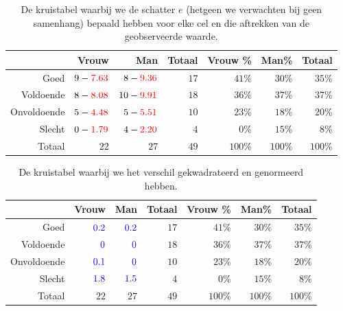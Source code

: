 \begin{table} \centering
  \begin{tabular}{@{}rrrrrrr@{}} \toprule
    & Vrouw & Man & Totaal & Vrouw \% & Man\%   & Totaal  \\ \midrule
    Goed        & $9 -\textcolor{red}{7.63}$     & $8 - \textcolor{red}{9.36}$   & $17$     & $41$\%  & $30$\% & $35$\% \\
    Voldoende   & $8 - \textcolor{red}{8.08}$   & $10 - \textcolor{red}{9.91}$  & $18$     & $36$\%  & $37$\%    & $37$\% \\
    Onvoldoende & $5 - \textcolor{red}{4.48}$    & $5 - \textcolor{red}{5.51}$  & $10$     & $23$\%  & $18$\% & $20$\% \\
    Slecht      & $0 - \textcolor{red}{1.79}$    & $4 - \textcolor{red}{2.20}$  & $4$      & $0$\%      & $15$\% & $8$\%  \\
    Totaal      & $22$    & $27$  & $49$     & $100$\%    & $100$\%   & $100$\%   \\
    \bottomrule
  \end{tabular}
  \caption{De kruistabel waarbij we de schatter $e$  (hetgeen we verwachten bij geen samenhang) bepaald hebben voor elke cel en die aftrekken van de geobserveerde waarde.}
  \label{tab:kruistabel2}
\end{table}

\begin{table} \centering
  \begin{tabular}{@{}rrrrrrr@{}} \toprule
    & Vrouw                   & Man                     & Totaal & Vrouw \% & Man\%   & Totaal  \\ \midrule
    Goed        & $\textcolor{blue}{0.2}$ & $\textcolor{blue}{0.2}$ & $17$   & $41$\%   & $30$\%  & $35$\% \\
    Voldoende   & $\textcolor{blue}{0}$   & $\textcolor{blue}{0}$   & $18$   & $36$\%   & $37$\%  & $37$\% \\
    Onvoldoende & $\textcolor{blue}{0.1}$ & $\textcolor{blue}{0}$   & $10$   & $23$\%   & $18$\%  & $20$\% \\
    Slecht      & $\textcolor{blue}{1.8}$ & $\textcolor{blue}{1.5}$ & $4$    & $0$\%    & $15$\%  & $8$\%  \\
    Totaal      & $22$                    & $27$                    & $49$   & $100$\%  & $100$\% & $100$\%   \\
    \bottomrule
  \end{tabular}
  \caption{De kruistabel waarbij we het verschil gekwadrateerd en genormeerd hebben.}
  \label{tab:kruistabel3}
\end{table}


